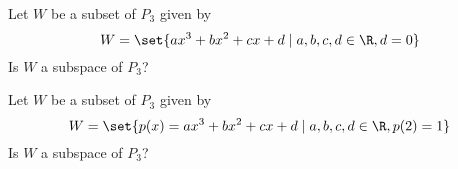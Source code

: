 \begin{enumialphparenastyle}
\begin{ex} Let $W$ be a subset of $P_3$ given by 
\[
W = \set{
ax^3 + bx^2 + cx + d \mid a,b,c,d \in \R, d = 0 }
\]
Is $W$ a subspace of $P_3$?
\end{ex}

\begin{ex} Let $W$ be a subset of $P_3$ given by 
\[
W = \set{
p(x) = ax^3 + bx^2 + cx + d \mid a,b,c,d \in \R, p(2) = 1 }
\]
Is $W$ a subspace of $P_3$?
\end{ex}

\end{enumialphparenastyle}
